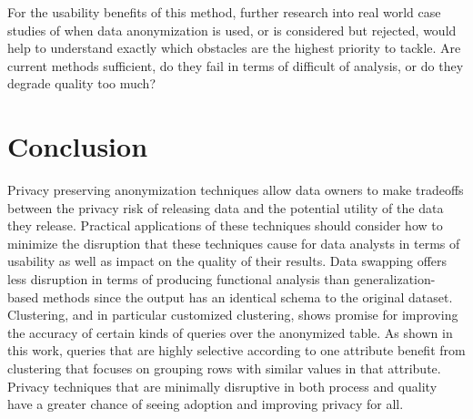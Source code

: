 For the usability benefits of this method, further research into real world case studies of when data anonymization is used, or is considered but rejected, would help to understand exactly which obstacles are the highest priority to tackle. Are current methods sufficient, do they fail in terms of difficult of analysis, or do they degrade quality too much?

\section{Conclusion}
Privacy preserving anonymization techniques allow data owners to make tradeoffs between the privacy risk of releasing data and the potential utility of the data they release. Practical applications of these techniques should consider how to minimize the disruption that these techniques cause for data analysts in terms of usability as well as impact on the quality of their results. Data swapping offers less disruption in terms of producing functional analysis than generalization-based methods since the output has an identical schema to the original dataset. Clustering, and in particular customized clustering, shows promise for improving the accuracy of certain kinds of queries over the anonymized table. As shown in this work, queries that are highly selective according to one attribute benefit from clustering that focuses on grouping rows with similar values in that attribute. Privacy techniques that are minimally disruptive in both process and quality have a greater chance of seeing adoption and improving privacy for all.



% 





